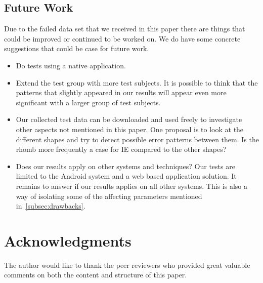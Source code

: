 \documentclass[runningheads,a4paper]{llncs}
\begin{document}
\subsection{Future Work}
Due to the failed data set that we received in this paper there are things that could be improved or continued to be worked on. 
We do have some concrete suggestions that could be case for future work. 

\begin{itemize}
	\item Do tests using a native application.
	\item Extend the test group with more test subjects. It is possible to think that the patterns that slightly appeared in our results will appear even more significant with a larger group of test subjects.
	\item Our collected test data can be downloaded and used freely to investigate other aspects not mentioned in this paper. One proposal is to look at the different shapes and try to detect possible error patterns between them. Is the rhomb more frequently a case for IE compared to the other shapes?
	\item Does our results apply on other systems and techniques? Our tests are limited to the Android system and a web based application solution. It remains to answer if our results applies on all other systems. This is also a way of isolating some of the affecting parameters mentioned in~\ref{subsec:drawbacks}.
\end{itemize}

\section{Acknowledgments}
The author would like to thank the peer reviewers who provided great valuable comments on both the content and structure of this paper.

%
% 
%
%

%


\end{document}
